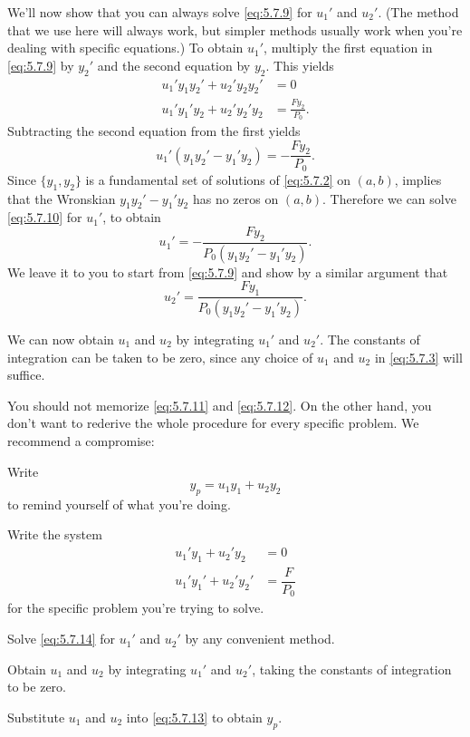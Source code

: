 We'll now show that you can always solve \eqref{eq:5.7.9} for $u_1'$
and $u_2'$. (The method that we use here will always work, but simpler
methods usually work when you're dealing with specific equations.) To
obtain $u_1'$, multiply the first equation in \eqref{eq:5.7.9} by $y_2'$
and the second equation by $y_2$. This yields
\begin{align*}
u_1'y_1y_2'+u_2'y_2y_2'&= 0  \\
u_1'y_1'y_2+u_2'y_2'y_2 &= \frac{Fy_2}{P_0}.
\end{align*}
Subtracting the second equation from the first yields
\begin{equation} \label{eq:5.7.10}
u_1'(y_1y_2'-y_1'y_2)=-\frac{Fy_2}{P_0}.
\end{equation}
Since $\{y_1,y_2\}$  is a fundamental set of solutions of \eqref{eq:5.7.2}
on $(a,b)$, \; implies that the Wronskian
 $y_1y_2'-y_1'y_2$  has no zeros on $(a,b)$.  Therefore we can solve
\eqref{eq:5.7.10} for $u_1'$, to obtain
\begin{equation} \label{eq:5.7.11}
u_1'=-\frac{Fy_2}{P_0(y_1y_2'-y_1'y_2)}.
\end{equation}
We leave it to you to start from \eqref{eq:5.7.9} and show by a similar
argument that
\begin{equation} \label{eq:5.7.12}
u_2'=\frac{Fy_1}{P_0(y_1y_2'-y_1'y_2)}.
\end{equation}

We can now obtain $u_1$ and $u_2$ by integrating $u_1'$ and $u_2'$.
The constants of integration can be taken to be zero, since any choice
of $u_1$ and $u_2$ in \eqref{eq:5.7.3} will suffice.

You should not memorize \eqref{eq:5.7.11} and \eqref{eq:5.7.12}. On the
other hand, you don't want to rederive the whole procedure for every
specific problem. We recommend a compromise:
\begin{alist}
\item %
Write
\begin{equation} \label{eq:5.7.13}
y_p=u_1y_1+u_2y_2
\end{equation}
to remind yourself of what you're doing.
\item %
Write the system
\begin{equation} \label{eq:5.7.14}
\begin{aligned}
u_1'y_1+u_2'y_2 &= 0  \\
u_1'y_1'+u_2'y_2' &= \dfrac{F}{P_0}
\end{aligned}
\end{equation}
for the specific problem  you're trying to solve.
\item %
Solve \eqref{eq:5.7.14} for $u_1'$ and $u_2'$ by any convenient method.
\item %
Obtain $u_1$ and $u_2$ by integrating $u_1'$ and $u_2'$,
taking the constants of integration to be zero.
\item %
Substitute $u_1$ and $u_2$ into \eqref{eq:5.7.13}  to obtain $y_p$.
\end{alist}

